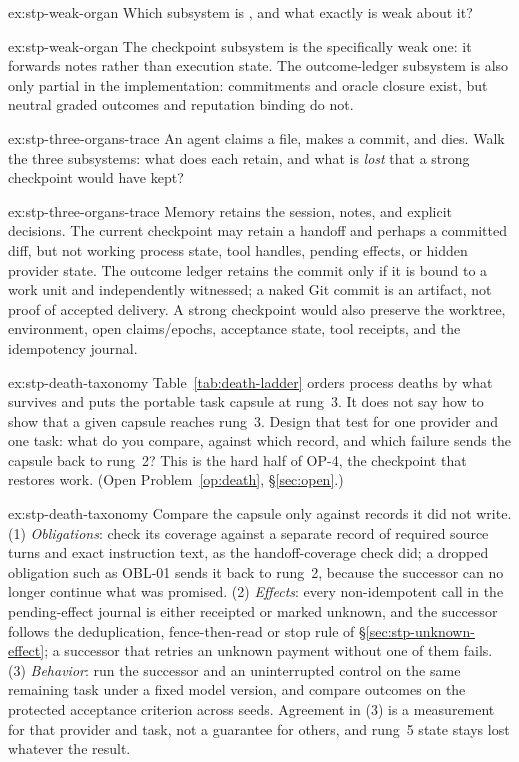 \documentclass[11pt,a4paper]{article}
\theoremstyle{definition}
\begin{document}
\begin{pdexercise}[kind=Check,rating=1]{ex:stp-weak-organ}
Which subsystem is \BUILTWEAK, and what exactly is weak about it?
\end{pdexercise}
\begin{pdsolution}{ex:stp-weak-organ}
The checkpoint subsystem is the specifically weak one: it forwards notes rather
than execution state. The outcome-ledger subsystem is also only partial in the
implementation: commitments and oracle closure exist, but neutral graded
outcomes and reputation binding do not.
\end{pdsolution}
\begin{pdexercise}[kind=Trace,rating=2]{ex:stp-three-organs-trace}
An agent claims a file, makes a commit, and dies. Walk the three subsystems: what
does each retain, and what is \emph{lost} that a strong checkpoint would have
kept?
\end{pdexercise}
\begin{pdsolution}{ex:stp-three-organs-trace}
Memory retains the session, notes, and explicit decisions. The current
checkpoint may retain a handoff and perhaps a committed diff, but not working
process state, tool handles, pending effects, or hidden provider state. The
outcome ledger retains the commit only if it is bound to a work unit and
independently witnessed; a naked Git commit is an artifact, not proof of
accepted delivery. A strong checkpoint would also preserve the worktree,
environment, open claims/epochs, acceptance state, tool receipts, and the
idempotency journal.
\end{pdsolution}
\begin{pdexercise}[kind=Open,rating=3]{ex:stp-death-taxonomy}
Table~\ref{tab:death-ladder} orders process deaths by what survives and puts
the portable task capsule at rung~3. It does not say how to show that a given
capsule reaches rung~3. Design that test for one provider and one task: what
do you compare, against which record, and which failure sends the capsule
back to rung~2? This is the hard half of OP-4, the checkpoint that restores
work. (Open Problem~\ref{op:death}, \S\ref{sec:open}.)
\end{pdexercise}
\begin{pdsolution}{ex:stp-death-taxonomy}
Compare the capsule only against records it did not write. (1)
\emph{Obligations}: check its coverage against a separate record of required
source turns and exact instruction text, as the handoff-coverage check did; a
dropped obligation such as OBL-01 sends it back to rung~2, because the
successor can no longer continue what was promised. (2) \emph{Effects}: every
non-idempotent call in the pending-effect journal is either receipted or
marked unknown, and the successor follows the deduplication, fence-then-read
or stop rule of \S\ref{sec:stp-unknown-effect}; a successor that retries an
unknown payment without one of them fails. (3) \emph{Behavior}: run the
successor and an uninterrupted control on the same remaining task under a
fixed model version, and compare outcomes on the protected acceptance
criterion across seeds. Agreement in (3) is a measurement for that provider
and task, not a guarantee for others, and rung~5 state stays lost whatever the
result.
\end{pdsolution}
\end{document}
